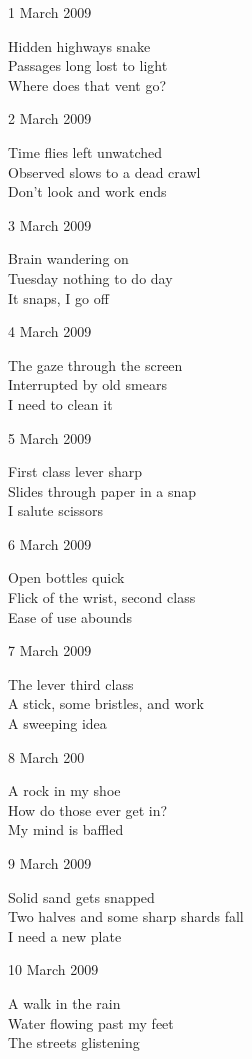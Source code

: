 \documentclass[12pt]{article}
\begin{document}
1 March 2009

Hidden highways snake \\
Passages long lost to light \\
Where does that vent go?

2 March 2009

Time flies left unwatched \\
Observed slows to a dead crawl \\
Don't look and work ends

\newpage

3 March 2009

Brain wandering on \\
Tuesday nothing to do day \\
It snaps, I go off

4 March 2009

The gaze through the screen \\
Interrupted by old smears \\
I need to clean it

5 March 2009

First class lever sharp \\
Slides through paper in a snap \\
I salute scissors

6 March 2009

Open bottles quick \\
Flick of the wrist, second class \\
Ease of use abounds

7 March 2009

The lever third class \\
A stick, some bristles, and work \\
A sweeping idea

8 March 200

A rock in my shoe \\
How do those ever get in? \\
My mind is baffled

\newpage

9 March 2009

Solid sand gets snapped \\
Two halves and some sharp shards fall \\
I need a new plate

10 March 2009

A walk in the rain \\
Water flowing past my feet \\
The streets glistening
\end{document}

